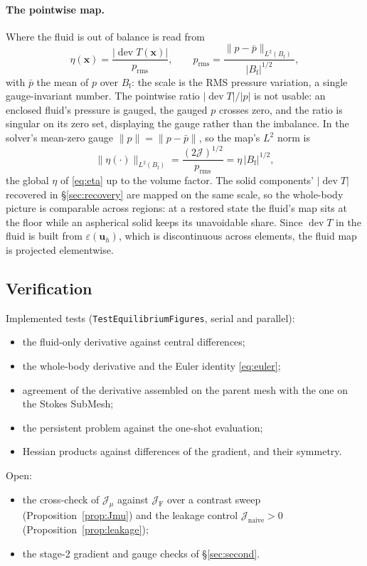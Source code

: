 \documentclass[11pt]{article}
\newcommand{\Jf}{\mathscr{J}}  %
\newcommand{\eps}{\varepsilon}
\newcommand{\Bf}{B_{\mathrm{f}}}
\newcommand{\bu}{\mathbf{u}}
\newcommand{\bx}{\mathbf{x}}
\newcommand{\dev}{\operatorname{dev}}
\newcommand{\norm}[1]{\lVert #1 \rVert}
\newcommand{\Ja}{\Jf _{\mathrm{naive}}}
\newcommand{\JF}{\Jf _{\mathrm{F}}}
\newcommand{\Jmu}{\Jf _{\mu}}
\begin{document}
\paragraph{The pointwise map.} Where the fluid is out of balance is read
from
\begin{equation}
  \eta(\bx) = \frac{|\dev T(\bx)|}{p_{\mathrm{rms}}} ,
  \qquad
  p_{\mathrm{rms}} = \frac{\norm{p - \bar p}_{L^2(\Bf)}}{|\Bf|^{1/2}} ,
\end{equation}
with $\bar p$ the mean of $p$ over $\Bf$: the scale is the RMS pressure
variation, a single gauge-invariant number. The pointwise ratio
$|\dev T|/|p|$ is not usable: an enclosed fluid's pressure is gauged, the
gauged $p$ crosses zero, and the ratio is singular on its zero set,
displaying the gauge rather than the imbalance. In the solver's
mean-zero gauge $\norm{p} = \norm{p - \bar p}$, so the map's $L^2$ norm is
\begin{equation}
  \norm{\eta(\cdot)}_{L^2(\Bf)} = \frac{(2\Jf )^{1/2}}{p_{\mathrm{rms}}}
  = \eta\,|\Bf|^{1/2} ,
\end{equation}
the global $\eta$ of \eqref{eq:eta} up to the volume factor. The solid
components' $|\dev T|$ recovered in \S\ref{sec:recovery} are mapped on
the same scale, so the whole-body picture is comparable across regions:
at a restored state the fluid's map sits at the floor while an
aspherical solid keeps its unavoidable share. Since $\dev T$ in the fluid
is built from $\eps(\bu_h)$, which is discontinuous across elements, the
fluid map is projected elementwise.

\subsection{Verification}
\label{sec:verification}

Implemented tests (\texttt{TestEquilibriumFigures}, serial and parallel):
\begin{itemize}
\item the fluid-only derivative against central differences;
\item the whole-body derivative and the Euler identity \eqref{eq:euler};
\item agreement of the derivative assembled on the parent mesh with the
  one on the Stokes SubMesh;
\item the persistent problem against the one-shot evaluation;
\item Hessian products against differences of the gradient, and their
  symmetry.
\end{itemize}
Open:
\begin{itemize}
\item the cross-check of $\Jmu$ against $\JF$ over a contrast sweep
  (Proposition~\ref{prop:Jmu}) and the leakage control $\Ja > 0$
  (Proposition~\ref{prop:leakage});
\item the stage-2 gradient and gauge checks of \S\ref{sec:second}.
\end{itemize}
\end{document}
